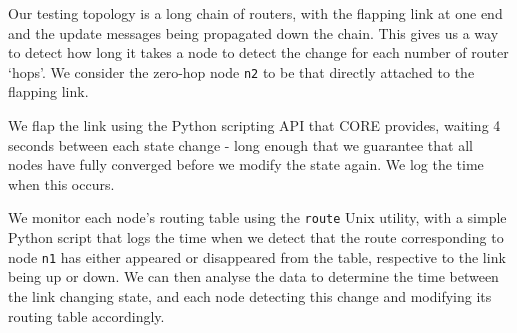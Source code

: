 \documentclass[10pt,twoside,a4paper]{article}
\begin{document}
Our testing topology is a long chain of routers, with the flapping link at one end and the update messages being propagated down the chain. This gives us a way to detect how long it takes a node to detect the change for each number of router `hops'. We consider the zero-hop node \texttt{n2} to be that directly attached to the flapping link.

We flap the link using the Python scripting API that CORE provides, waiting 4 seconds between each state change - long enough that we guarantee that all nodes have fully converged before we modify the state again. We log the time when this occurs.

We monitor each node's routing table using the \texttt{route} Unix utility, with a simple Python script that logs the time when we detect that the route corresponding to node \texttt{n1} has either appeared or disappeared from the table, respective to the link being up or down. We can then analyse the data to determine the time between the link changing state, and each node detecting this change and modifying its routing table accordingly.
\end{document}
